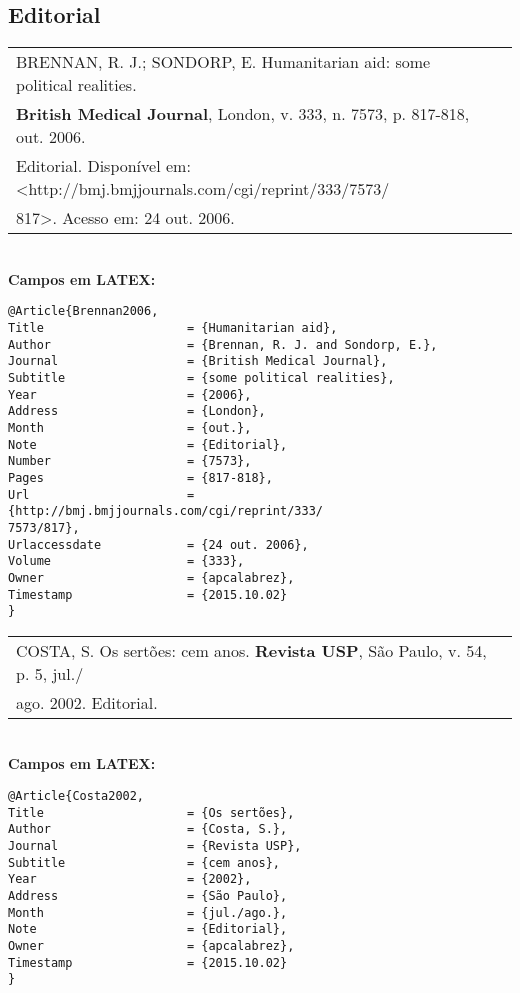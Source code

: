 \subsection{Editorial} 


\begin{tabular}{|l|c|} \hline
BRENNAN, R. J.; SONDORP, E. Humanitarian aid: some political realities. \\ \textbf{British Medical Journal}, London, v. 333, n. 7573, p. 817-818, out. 2006. \\Editorial. Disponível em: <http://bmj.bmjjournals.com/cgi/reprint/333/7573/\\817>. Acesso em: 24 out. 2006. \\\hline
\end{tabular} \\

\textbf{Campos em LATEX:} 

\begin{verbatim}
@Article{Brennan2006,
Title                    = {Humanitarian aid},
Author                   = {Brennan, R. J. and Sondorp, E.},
Journal                  = {British Medical Journal},
Subtitle                 = {some political realities},
Year                     = {2006},
Address                  = {London},
Month                    = {out.},
Note                     = {Editorial},
Number                   = {7573},
Pages                    = {817-818},
Url                      = {http://bmj.bmjjournals.com/cgi/reprint/333/
7573/817},
Urlaccessdate            = {24 out. 2006},
Volume                   = {333},
Owner                    = {apcalabrez},
Timestamp                = {2015.10.02}
}
\end{verbatim}

\begin{tabular}{|l|c|} \hline
COSTA, S. Os sertões: cem anos. \textbf{Revista USP}, São Paulo, v. 54, p. 5, jul./\\ago. 2002. Editorial.\\\hline
\end{tabular} \\

\textbf{Campos em LATEX:} 

\begin{verbatim}
@Article{Costa2002,
Title                    = {Os sertões},
Author                   = {Costa, S.},
Journal                  = {Revista USP},
Subtitle                 = {cem anos},
Year                     = {2002},
Address                  = {São Paulo},
Month                    = {jul./ago.},
Note                     = {Editorial},
Owner                    = {apcalabrez},
Timestamp                = {2015.10.02}
}
\end{verbatim}
